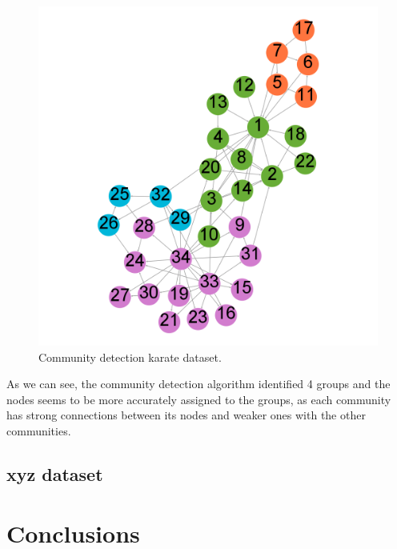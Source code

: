 \documentclass[sigconf]{acmart}
\begin{document}
\FloatBarrier
\begin{figure}[h]
    \centering
    \includegraphics[width=0.72\linewidth, height=0.72\linewidth]{Img/karate community detection.png}
    \caption{Community detection karate dataset.}
\end{figure}
\FloatBarrier
\noindent As we can see, the community detection algorithm identified 4 groups and the nodes seems to be more accurately assigned to the groups, as each community has strong connections between its nodes and weaker ones with the other communities.

\subsection{xyz dataset}

\section{Conclusions}
\end{document}
